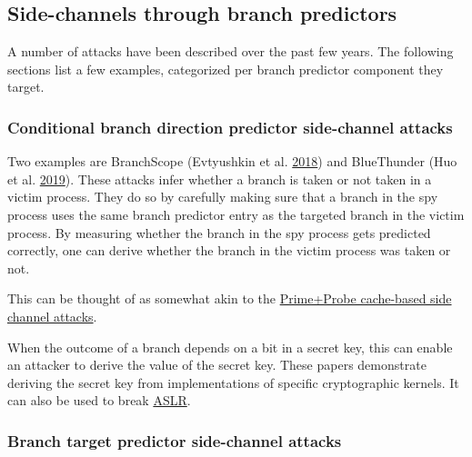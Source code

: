 \documentclass[a4paper,]{report}
\begin{document}
\hypertarget{side-channels-through-branch-predictors}{%
\subsection{Side-channels through branch
predictors}\label{side-channels-through-branch-predictors}}

A number of attacks have been described over the past few years. The
following sections list a few examples, categorized per branch predictor
component they target.

\hypertarget{conditional-branch-direction-predictor-side-channel-attacks}{%
\subsubsection{Conditional branch direction predictor side-channel
attacks}\label{conditional-branch-direction-predictor-side-channel-attacks}}


Two examples are BranchScope (Evtyushkin et al.
\protect\hyperlink{ref-Evtyushkin2018}{2018}) and
BlueThunder (Huo et al.
\protect\hyperlink{ref-Huo2019}{2019}). These attacks
infer whether a branch is taken or not taken in a victim process. They
do so by carefully making sure that a branch in the spy process uses the
same branch predictor entry as the targeted branch in the victim
process. By measuring whether the branch in the spy process gets
predicted correctly, one can derive whether the branch in the victim
process was taken or not.

This can be thought of as somewhat akin to the
\protect\hyperlink{primeprobe}{Prime+Probe cache-based side channel
attacks}.

When the outcome of a branch depends on a bit in a secret key, this can
enable an attacker to derive the value of the secret key. These papers
demonstrate deriving the secret key from implementations of specific
cryptographic kernels. It can also be used to break
\protect\hyperlink{aslr}{ASLR}.

\hypertarget{branch-target-predictor-side-channel-attacks}{%
\subsubsection{Branch target predictor side-channel
attacks}\label{branch-target-predictor-side-channel-attacks}}

\end{document}
